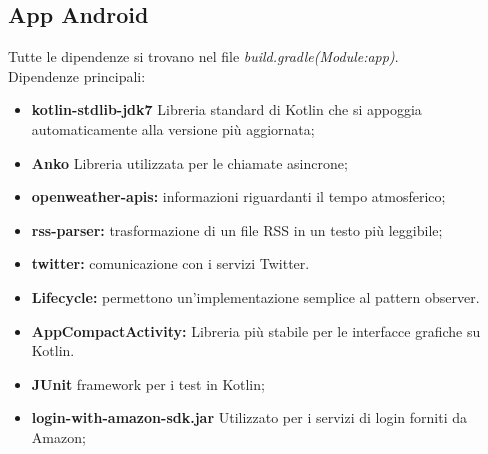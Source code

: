 \subsection{App Android}

Tutte le dipendenze si trovano nel file \textit{build.gradle(Module:app)}.\\

Dipendenze principali:
\begin{itemize}
	\item \textbf {kotlin-stdlib-jdk7} Libreria standard di Kotlin che si appoggia automaticamente alla versione più aggiornata;
	\item \textbf {Anko} Libreria utilizzata per le chiamate asincrone;
	\item \textbf{openweather-apis:} informazioni riguardanti il tempo atmosferico;
	\item \textbf{rss-parser:} trasformazione di un file RSS in un testo più leggibile;
	\item \textbf{twitter:} comunicazione con i servizi Twitter.
	\item \textbf{Lifecycle:} permettono un'implementazione semplice al pattern observer.
	\item \textbf{AppCompactActivity:} Libreria più stabile per le interfacce grafiche su Kotlin.
	\item \textbf{JUnit} framework per i test in Kotlin;
	\item \textbf{login-with-amazon-sdk.jar} Utilizzato per i servizi di login forniti da Amazon;
\end{itemize}
